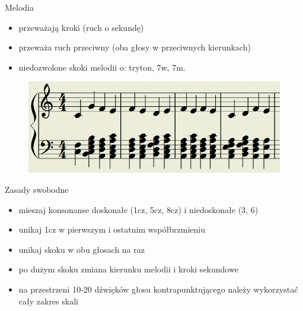 \documentclass{beamer}
\begin{document}
\begin{frame}
	Melodia
	\begin{itemize}
		\item przeważają kroki (ruch o sekundę)
		\item przeważa ruch przeciwny (oba głosy w przeciwnych kierunkach)
		\item niedozwolone skoki melodii o: tryton, 7w, 7m.
	\end{itemize}
	\begin{figure}
	   \includegraphics[scale=0.3]{images/kontrapunkt_mozliwosci.png}
	\end{figure}
\end{frame}

\begin{frame}
	Zasady swobodne
	\begin{itemize}
		\item mieszaj konsonanse doskonałe (1cz, 5cz, 8cz) i niedoskonałe (3, 6)
		\item unikaj 1cz w pierwszym i ostatnim współbrzmieniu
		\item unikaj skoku w obu głosach na raz
		\item po dużym skoku zmiana kierunku melodii i kroki sekundowe
		\item na przestrzeni 10-20 dźwięków głosu kontrapunktującego należy wykorzystać cały zakres skali
	\end{itemize}
\end{frame}
\end{document}
